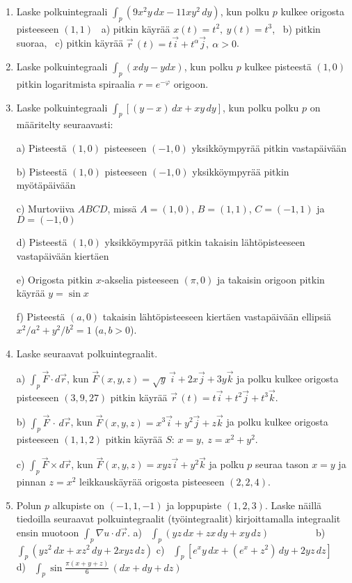 \Harj
\begin{enumerate}

\item
Laske polkuintegraali $\int_p (9x^2y\,dx-11xy^2\,dy)$, kun polku $p$ kulkee origosta 
pisteeseen $(1,1)$ \ a) pitkin käyrää $x(t)=t^2,\ y(t)=t^3$, \ b) pitkin suoraa, \ 
c) pitkin käyrää $\vec r\,(t)=t\vec i+t^\alpha\vec j,\ \alpha>0$.

\item
Laske polkuintegraali $\int_p (xdy-ydx)$, kun polku $p$ kulkee pisteestä $(1,0)$ pitkin
logaritmista spiraalia $r=e^{-\varphi}$ origoon.

\item
Laske polkuintegraali $\int_p [(y-x)\,dx+xy\,dy]$, kun polku polku $p$ on määritelty 
seuraavasti:

a) Pisteestä $(1,0)$ pisteeseen $(-1,0)$ yksikköympyrää pitkin vastapäivään

b) Pisteestä $(1,0)$ pisteeseen $(-1,0)$ yksikköympyrää pitkin myötäpäivään

c) Murtoviiva $ABCD$, missä $A=(1,0)$, $B=(1,1)$, $C=(-1,1)$ ja $D=(-1,0)$

d) Pisteestä $(1,0)$ yksikköympyrää pitkin takaisin lähtöpisteeseen vastapäivään kiertäen

e) Origosta pitkin $x$-akselia pisteeseen $(\pi,0)$ ja takaisin origoon pitkin käyrää $y=\sin x$

f) Pisteestä $(a,0)$ takaisin lähtöpisteeseen kiertäen vastapäivään ellipsiä
   $x^2/a^2+y^2/b^2=1$ ($a,b>0$).

\item 
Laske seuraavat polkuintegraalit.

a) $\int_p \vec F \cdot d\vec r$, kun $\vec F(x,y,z)=\sqrt y\,\vec i+2x\vec j+3y\vec k$ ja
polku kulkee origosta pisteeseen $(3,9,27)$ pitkin käyrää
$\vec r\,(t)=t\vec i+t^2\vec j+t^3\vec k$.

b) $\int_p \vec F\,\cdot\,d\vec r$, kun $\vec F(x,y,z)=x^3\vec i+y^2\vec j+z\vec k$ ja polku
kulkee origosta pisteeseen $(1,1,2)$ pitkin käyrää $S:\,x=y,\ z=x^2+y^2$.

c) $\int_p \vec F \times d\vec r$, kun $\vec F(x,y,z)=xyz\vec i+y^2\vec k$ ja polku $p$ seuraa
tason $x=y$ ja pinnan $z=x^2$ leikkauskäyrää origosta pisteeseen $(2,2,4)$.

\item 
Polun $p$ alkupiste on $(-1,1,-1)$ ja loppupiste $(1,2,3)$. Laske näillä tiedoilla seuraavat
polkuintegraalit (työintegraalit) kirjoittamalla integraalit ensin muotoon 
$\int_p \nabla u \cdot d\vec r$. \vspace{1mm}\newline
a) \ $\int_p (yz\,dx + zx\,dy + xy\,dz) \qquad\qquad\ \ $
b) \ $\int_p (yz^2\,dx+xz^2\,dy+2xyz\,dz)$ \newline
c) \ $\int_p [e^x y\,dx+(e^x+z^2)\,dy+2yz\,dz] \quad\ $
d) \ $\int_p \sin\frac{\pi(x+y+z)}{6}\,(dx+dy+dz)$


\end{enumerate}
